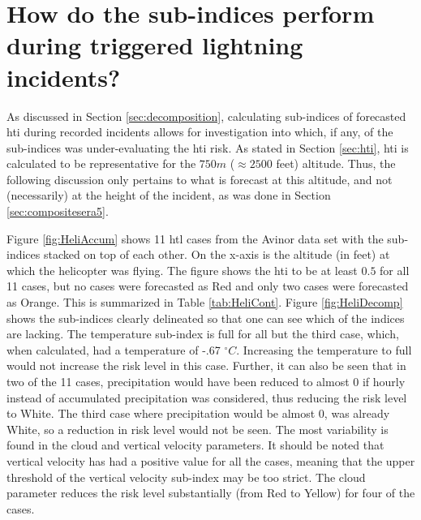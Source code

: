 \section{How do the sub-indices perform during triggered lightning incidents?}
As discussed in Section \ref{sec:decomposition}, calculating sub-indices of forecasted \acrshort{hti} during recorded incidents allows for investigation into which, if any, of the sub-indices was under-evaluating the \acrshort{hti} risk. As stated in Section \ref{sec:hti}, \acrshort{hti} is calculated to be representative for the $750m$ ($\approx 2500$ feet) altitude. Thus, the following discussion only pertains to what is forecast at this altitude, and not (necessarily) at the height of the incident, as was done in Section \ref{sec:compositesera5}.

Figure \ref{fig:HeliAccum} shows 11 \acrshort{htl} cases from the Avinor data set with the sub-indices stacked on top of each other. On the x-axis is the altitude (in feet) at which the helicopter was flying. The figure shows the \acrshort{hti} to be at least $0.5$ for all 11 cases, but no cases were forecasted as Red and only two cases were forecasted as Orange. This is summarized in Table \ref{tab:HeliCont}. Figure \ref{fig:HeliDecomp} shows the sub-indices clearly delineated so that one can see which of the indices are lacking. The temperature sub-index is full for all but the third case, which, when calculated, had a temperature of -.67 $^{\circ}C$. Increasing the temperature to full would not increase the risk level in this case. Further, it can also be seen that in two of the 11 cases, precipitation would have been reduced to almost 0 if hourly instead of accumulated precipitation was considered, thus reducing the risk level to White. The third case where precipitation would be almost 0, was already White, so a reduction in risk level would not be seen. The most variability is found in the cloud and vertical velocity parameters. It should be noted that vertical velocity has had a positive value for all the cases, meaning that the upper threshold of the vertical velocity sub-index may be too strict. The cloud parameter reduces the risk level substantially (from Red to Yellow) for four of the cases. 

